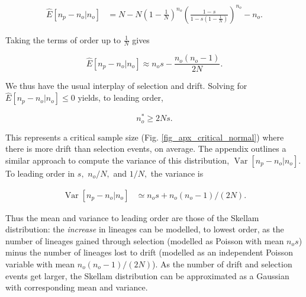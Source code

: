 \documentclass[review,nonatbib]{elsarticle}
\newcommand{\sgcomment}[1]{{\color{red}{SG: #1}}}
\begin{document}

\begin{equation}
  \begin{aligned}
    \label{eq_gauss_mean}
    \hat{E}[n_p -n_o | n_o] &= N-N\left( 1 - \frac{1}{N} \right)^{n_o}\left( \frac{1-s}{1-s \left( 1 - \frac{1}{N} \right)}\right)^{n_o}-n_o.
  \end{aligned}
\end{equation}

Taking the terms of order up to $\frac{1}{N}$ gives

\begin{equation}
    \label{eq_lineages_approx}
    \hat{E}[n_p-n_o | n_o] \approx n_o  s - \frac{n_o (n_o-1) }{2N}.
\end{equation}

We thus have the usual interplay of selection and drift. Solving for $ \hat{E}[n_p -n_o | n_o]\leq0$
yields, to leading order,

\begin{equation}
  \label{eq_critical_sample}
  n_o^* \ge 2N s.
\end{equation}

This represents a critical sample size (Fig.
\ref{fig_apx_critical_normal}) where there is more drift than selection events, on average.
The appendix outlines a similar approach to compute the variance of this distribution, $\operatorname{Var}[n_p-n_o | n_o].$
To leading order in $s,$ $n_o/N,$ and $1/N,$ the variance is

\begin{equation}
  \begin{aligned}
    \operatorname{Var}[n_p-n_o | n_o] &\simeq
   n_o  s +   n_o (n_o-1)/(2 N).
    \label{eq_gauss_var}
  \end{aligned}
\end{equation}

Thus the mean and variance to leading order are those of the Skellam distribution: the
\textit{increase} in lineages can be modelled, to lowest order, as the number of lineages gained
through selection (modelled as Poisson with mean  $ n_o s$) minus the number of lineages lost to
drift (modelled as an independent Poisson variable with mean  $ n_o (n_o-1)/(2 N)$).
As the number of drift and selection events get larger, the Skellam distribution can be approximated as a
Gaussian with corresponding mean and variance.

\end{document}
